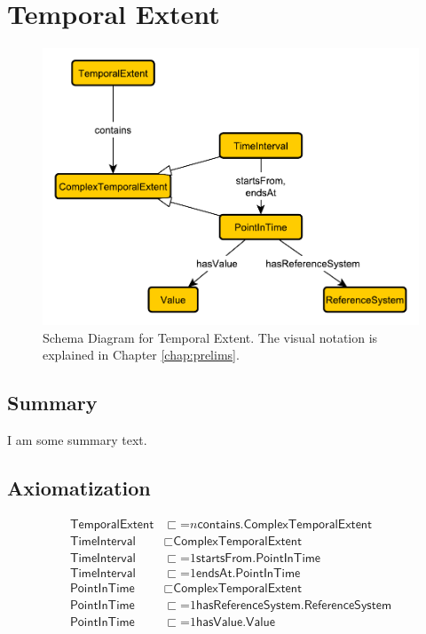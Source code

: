 \section{Temporal Extent}
\label{sec:Temporal}
\begin{figure}[h!]
\begin{center}
\includegraphics[width=.8\textwidth]{figures/temporal}
\end{center}
\caption{Schema Diagram for Temporal Extent. The visual notation is explained in Chapter \ref{chap:prelims}.}
\label{fig:Temporal}
\end{figure}
\subsection{Summary}
\label{sum:Temporal}
I am some summary text.

\subsection{Axiomatization}
\label{axs:Temporal}
\begin{align}
\textsf{TemporalExtent} &\sqsubset \mathord{=}n \textsf{contains.ComplexTemporalExtent} \\
\textsf{TimeInterval} &\sqsubset \textsf{ComplexTemporalExtent} \\
\textsf{TimeInterval} &\sqsubset \mathord{=}1 \textsf{startsFrom.PointInTime} \\
\textsf{TimeInterval} &\sqsubset \mathord{=}1 \textsf{endsAt.PointInTime} \\
\textsf{PointInTime} &\sqsubset \textsf{ComplexTemporalExtent} \\
\textsf{PointInTime} &\sqsubset \mathord{=}1 \textsf{hasReferenceSystem.ReferenceSystem} \\
\textsf{PointInTime} &\sqsubset \mathord{=}1 \textsf{hasValue.Value}
\end{align}

